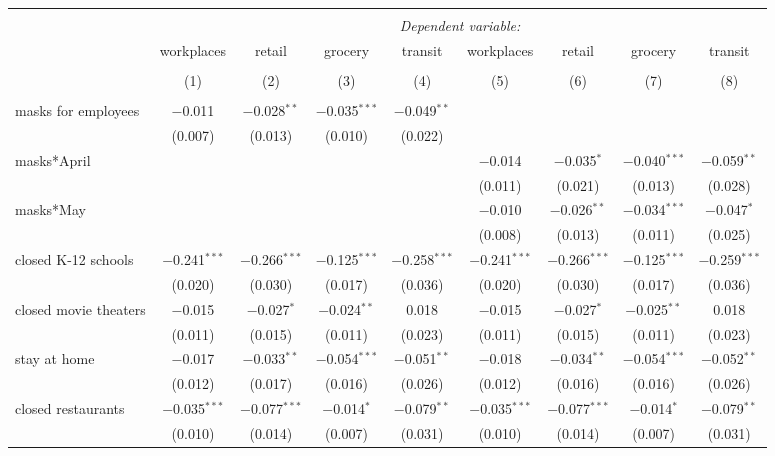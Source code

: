 \begin{tabular}{@{\extracolsep{1pt}}lcccccccc} 
\\[-1.8ex]\hline 
\hline \\[-1.8ex] 
 & \multicolumn{8}{c}{\textit{Dependent variable:}} \\ 
\cline{2-9} 
 & workplaces & retail & grocery & transit & workplaces & retail & grocery & transit \\ 
\\[-1.8ex] & (1) & (2) & (3) & (4) & (5) & (6) & (7) & (8)\\ 
\hline \\[-1.8ex] 
 masks for employees & $-$0.011 & $-$0.028$^{**}$ & $-$0.035$^{***}$ & $-$0.049$^{**}$ &  &  &  &  \\ 
  & (0.007) & (0.013) & (0.010) & (0.022) &  &  &  &  \\ 
  masks*April &  &  &  &  & $-$0.014 & $-$0.035$^{*}$ & $-$0.040$^{***}$ & $-$0.059$^{**}$ \\ 
  &  &  &  &  & (0.011) & (0.021) & (0.013) & (0.028) \\ 
  masks*May &  &  &  &  & $-$0.010 & $-$0.026$^{**}$ & $-$0.034$^{***}$ & $-$0.047$^{*}$ \\ 
  &  &  &  &  & (0.008) & (0.013) & (0.011) & (0.025) \\ 
  closed K-12 schools & $-$0.241$^{***}$ & $-$0.266$^{***}$ & $-$0.125$^{***}$ & $-$0.258$^{***}$ & $-$0.241$^{***}$ & $-$0.266$^{***}$ & $-$0.125$^{***}$ & $-$0.259$^{***}$ \\ 
  & (0.020) & (0.030) & (0.017) & (0.036) & (0.020) & (0.030) & (0.017) & (0.036) \\ 
  closed movie theaters & $-$0.015 & $-$0.027$^{*}$ & $-$0.024$^{**}$ & 0.018 & $-$0.015 & $-$0.027$^{*}$ & $-$0.025$^{**}$ & 0.018 \\ 
  & (0.011) & (0.015) & (0.011) & (0.023) & (0.011) & (0.015) & (0.011) & (0.023) \\ 
  stay at home & $-$0.017 & $-$0.033$^{**}$ & $-$0.054$^{***}$ & $-$0.051$^{**}$ & $-$0.018 & $-$0.034$^{**}$ & $-$0.054$^{***}$ & $-$0.052$^{**}$ \\ 
  & (0.012) & (0.017) & (0.016) & (0.026) & (0.012) & (0.016) & (0.016) & (0.026) \\ 
  closed restaurants & $-$0.035$^{***}$ & $-$0.077$^{***}$ & $-$0.014$^{*}$ & $-$0.079$^{**}$ & $-$0.035$^{***}$ & $-$0.077$^{***}$ & $-$0.014$^{*}$ & $-$0.079$^{**}$ \\ 
  & (0.010) & (0.014) & (0.007) & (0.031) & (0.010) & (0.014) & (0.007) & (0.031) \\ 

\end{tabular}
